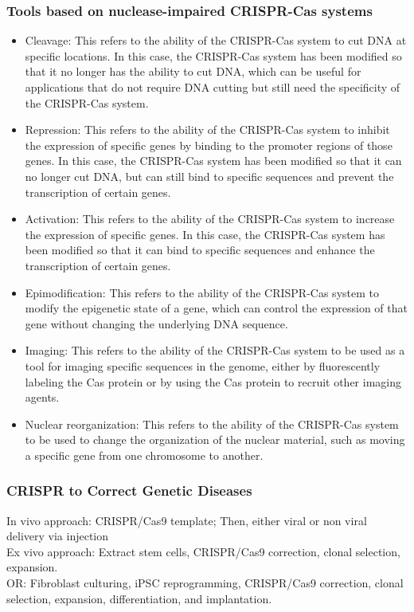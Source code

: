 \begin{itemize}
\begin{itemize}
\subsubsection{Tools based on nuclease-impaired CRISPR-Cas systems}

    \begin{itemize}
\item Cleavage: This refers to the ability of the CRISPR-Cas system to cut DNA at specific locations. In this case, the CRISPR-Cas system has been modified so that it no longer has the ability to cut DNA, which can be useful for applications that do not require DNA cutting but still need the specificity of the CRISPR-Cas system.
\item Repression: This refers to the ability of the CRISPR-Cas system to inhibit the expression of specific genes by binding to the promoter regions of those genes. In this case, the CRISPR-Cas system has been modified so that it can no longer cut DNA, but can still bind to specific sequences and prevent the transcription of certain genes.
\item Activation: This refers to the ability of the CRISPR-Cas system to increase the expression of specific genes. In this case, the CRISPR-Cas system has been modified so that it can bind to specific sequences and enhance the transcription of certain genes.
\item Epimodification: This refers to the ability of the CRISPR-Cas system to modify the epigenetic state of a gene, which can control the expression of that gene without changing the underlying DNA sequence.
\item Imaging: This refers to the ability of the CRISPR-Cas system to be used as a tool for imaging specific sequences in the genome, either by fluorescently labeling the Cas protein or by using the Cas protein to recruit other imaging agents.
\item Nuclear reorganization: This refers to the ability of the CRISPR-Cas system to be used to change the organization of the nuclear material, such as moving a specific gene from one chromosome to another.
\end{itemize}

\subsubsection{CRISPR to Correct Genetic Diseases}
In vivo approach: CRISPR/Cas9 template; Then, either viral or non viral delivery via injection
\\Ex vivo approach: Extract stem cells, CRISPR/Cas9 correction, clonal selection, expansion.
\\OR: Fibroblast culturing, iPSC reprogramming, CRISPR/Cas9 correction, clonal selection, expansion, differentiation, and  implantation.

\end{itemize}
\end{itemize}
